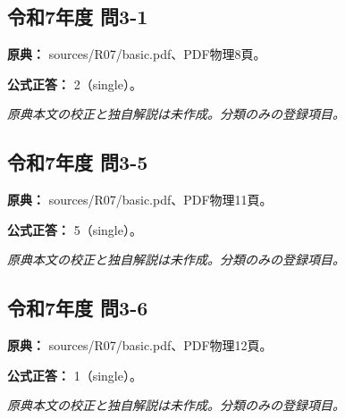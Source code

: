 \subsection{令和7年度 問3-1}
\label{q:r07-reg-basic-3-1}

\noindent\textbf{原典：} sources/R07/basic.pdf、PDF物理8頁。

\textbf{公式正答：} 2（single）。

\par\textit{原典本文の校正と独自解説は未作成。分類のみの登録項目。}

\subsection{令和7年度 問3-5}
\label{q:r07-reg-basic-3-5}

\noindent\textbf{原典：} sources/R07/basic.pdf、PDF物理11頁。

\textbf{公式正答：} 5（single）。

\par\textit{原典本文の校正と独自解説は未作成。分類のみの登録項目。}

\subsection{令和7年度 問3-6}
\label{q:r07-reg-basic-3-6}

\noindent\textbf{原典：} sources/R07/basic.pdf、PDF物理12頁。

\textbf{公式正答：} 1（single）。

\par\textit{原典本文の校正と独自解説は未作成。分類のみの登録項目。}
